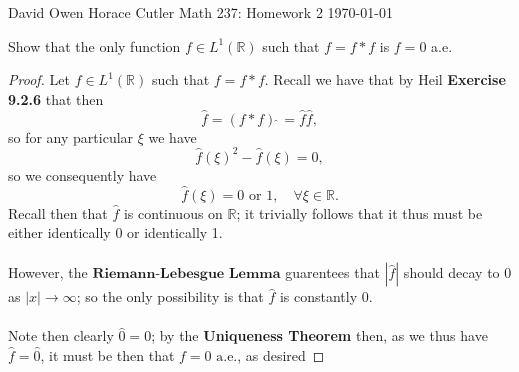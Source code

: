 \documentclass[12pt]{article}
\newenvironment{ex}[2][Exercise]{\begin{trivlist}
\item[\hskip \labelsep {\bfseries #1}\hskip \labelsep {\bfseries #2.}]}{\end{trivlist}}
\begin{document}
\noindent David Owen Horace Cutler \hfill {\Large Math 237: Homework 2} \hfill \today

\begin{ex}{1}
    Show that the only function $f \in L^1(\mathbb{R})$ such that $f = f * f$ is $f = 0$ a.e. 
    \begin{proof}
        Let $f \in L^1(\mathbb{R})$ such that $f = f * f$. Recall we have that by Heil \textbf{Exercise 9.2.6} that then 
        $$\hat{f} = (f * f)\hat{\;} = \hat{f}\hat{f},$$
        so for any particular $\xi$ we have 
        $$\hat{f}(\xi)^2 - \hat{f}(\xi) = 0,$$
        so we consequently have 
        $$\hat{f}(\xi) = 0 \text{ or } 1, \quad \forall \xi \in \mathbb{R}.$$
        Recall then that $\hat{f}$ is continuous on $\mathbb{R}$; it trivially follows that it thus must be either identically 0 or identically 1. \\ \\
        However, the $\textbf{Riemann-Lebesgue Lemma}$ guarentees that $|\hat{f}|$ should decay to $0$ as $|x| \rightarrow \infty$; so the only possibility is that $\hat{f}$ is constantly 0. \\ \\
        Note then clearly $\hat{0} = 0$; by the \textbf{Uniqueness Theorem} then, as we thus have $\hat{f} = \hat{0}$, it must be then that $f = 0 \text{ a.e.}$, as desired
    \end{proof}
\end{ex}
\end{document}
